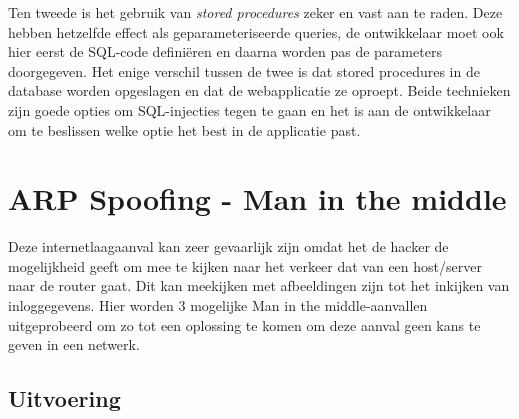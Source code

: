 \documentclass[pdftex,a4paper,12pt]{report}
\begin{document}
Ten tweede is het gebruik van \textit{stored procedures} zeker en vast aan te raden. Deze hebben hetzelfde effect als geparameteriseerde queries, de ontwikkelaar moet ook hier eerst de SQL-code definiëren en daarna worden pas de parameters doorgegeven. Het enige verschil tussen de twee is dat stored procedures in de database worden opgeslagen en dat de webapplicatie ze oproept. Beide technieken zijn goede opties om SQL-injecties tegen te gaan en het is aan de ontwikkelaar om te beslissen welke optie het best in de applicatie past. \citep{Wichers2013}

\section{ARP Spoofing - Man in the middle}
Deze internetlaagaanval kan zeer gevaarlijk zijn omdat het de hacker de mogelijkheid geeft om mee te kijken naar het verkeer dat van een host/server naar de router gaat. Dit kan meekijken met afbeeldingen zijn tot het inkijken van inloggegevens. Hier worden 3 mogelijke Man in the middle-aanvallen uitgeprobeerd om zo tot een oplossing te komen om deze aanval geen kans te geven in een netwerk.

\subsection{Uitvoering}
\end{document}

